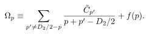\begin{equation}
    \label{omegap}
    \Omega_p\equiv\sum_{p' \neq D_2/2-p} {\tilde C_{p'}\over
      p+p'-D_2/2} + f(p).
\end{equation}

